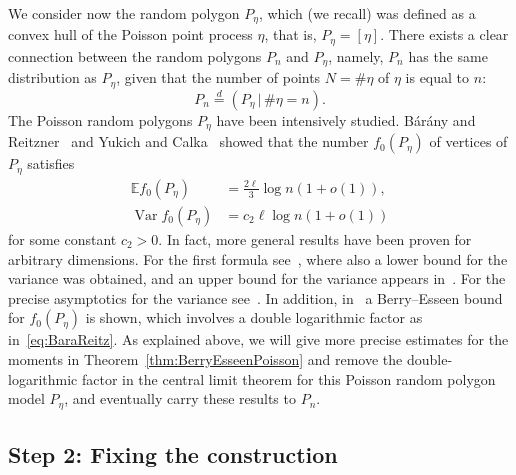 \documentclass[AHL,Unicode,longabstracts,published]{cedram}
\newcommand{\var}{\operatorname{Var}}
\newcommand{\bbE}{\mathbb{E}}
\begin{document}
We consider now the random polygon $P_{\eta}$, which (we recall) was defined as a convex hull of the Poisson point process $\eta$, that is, $P_{\eta}=[\eta]$. There exists a clear connection between the random polygons $P_n$ and $P_{\eta}$, namely, $P_n$ has the same distribution as $P_\eta$, given that the number of points $N=\#\eta$ of $\eta$ is equal to $n$:
\[
P_n\stackrel{d}{=}(P_{\eta}\,|\,\#\eta = n).
\]
The Poisson random polygons $P_{\eta}$ have been intensively studied. Bárány and Reitzner~\cite{BR10} and Yukich and Calka~\cite{CY17} showed that the number $f_0(P_\eta)$ of vertices of $P_\eta$ satisfies
\begin{align*}
\bbE f_0(P_{\eta})&=\frac{2 \ell}{3} \log n (1+o(1)),
\\
\var f_0(P_{\eta})&= c_2 \ell \log n (1+o(1))
\end{align*}
for some constant $c_2>0$. In fact, more general results have been proven for arbitrary dimensions. For the first formula see~\cite[Theorem~1.2]{BR10}, where also a lower bound for the variance was obtained, and an upper bound for the variance appears in~\cite[Theorem~1.1]{BR10a}. For the precise asymptotics for the variance see~\cite[Theorem~1.3]{CY17}. In addition, in~\cite{BR10a} a Berry--Esseen bound for $f_0(P_\eta)$ is shown, which involves a double logarithmic factor as in~\eqref{eq:BaraReitz}. As explained above, we will give more precise estimates for the moments in Theorem~\ref{thm:BerryEsseenPoisson} and remove the double-logarithmic factor in the central limit theorem for this Poisson random polygon model $P_\eta$, and eventually carry these results to $P_n$.


\subsection{Step 2: Fixing the construction}\label{step2}
\end{document}
